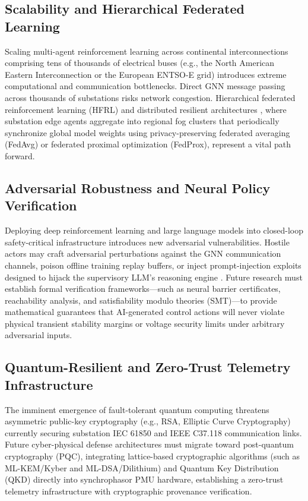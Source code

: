 \documentclass[journal,compsoc]{IEEEtran}
\begin{document}
\subsection{Scalability and Hierarchical Federated Learning}
Scaling multi-agent reinforcement learning across continental interconnections comprising tens of thousands of electrical buses (e.g., the North American Eastern Interconnection or the European ENTSO-E grid) introduces extreme computational and communication bottlenecks. Direct GNN message passing across thousands of substations risks network congestion. Hierarchical federated reinforcement learning (HFRL) and distributed resilient architectures \cite{ref79, ref83}, where substation edge agents aggregate into regional fog clusters that periodically synchronize global model weights using privacy-preserving federated averaging (FedAvg) or federated proximal optimization (FedProx), represent a vital path forward.

\subsection{Adversarial Robustness and Neural Policy Verification}
Deploying deep reinforcement learning and large language models into closed-loop safety-critical infrastructure introduces new adversarial vulnerabilities. Hostile actors may craft adversarial perturbations against the GNN communication channels, poison offline training replay buffers, or inject prompt-injection exploits designed to hijack the supervisory LLM's reasoning engine \cite{ref81, ref82}. Future research must establish formal verification frameworks---such as neural barrier certificates, reachability analysis, and satisfiability modulo theories (SMT)---to provide mathematical guarantees that AI-generated control actions will never violate physical transient stability margins or voltage security limits under arbitrary adversarial inputs.

\subsection{Quantum-Resilient and Zero-Trust Telemetry Infrastructure}
The imminent emergence of fault-tolerant quantum computing threatens asymmetric public-key cryptography (e.g., RSA, Elliptic Curve Cryptography) currently securing substation IEC 61850 and IEEE C37.118 communication links. Future cyber-physical defense architectures must migrate toward post-quantum cryptography (PQC), integrating lattice-based cryptographic algorithms (such as ML-KEM/Kyber and ML-DSA/Dilithium) and Quantum Key Distribution (QKD) directly into synchrophasor PMU hardware, establishing a zero-trust telemetry infrastructure with cryptographic provenance verification.
\end{document}

